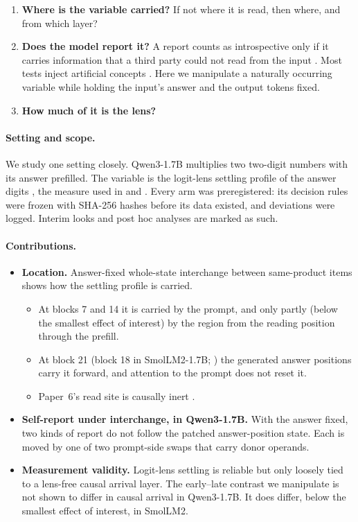\documentclass[11pt]{article}
\begin{document}
\begin{enumerate}
\item \textbf{Where is the variable carried?} If not where it is read, then where, and from which layer?
\item \textbf{Does the model report it?} A report counts as introspective only if it carries information that a third party could not read from the input \citep{song2025privileged,singh2026reality}. Most tests inject artificial concepts \citep{lindsey2025emergent,ferrara2026owmi,lederman2026contentagnostic}. Here we manipulate a naturally occurring variable while holding the input's answer and the output tokens fixed.
\item \textbf{How much of it is the lens?}
\end{enumerate}

\paragraph{Setting and scope.} We study one setting closely. Qwen3-1.7B \citep{yang2025qwen3} multiplies two two-digit numbers with its answer prefilled. The variable is the logit-lens settling profile of the answer digits \citep{nostalgebraist2020logitlens}, the measure used in \citet{ramdan2026crv2} and \citet{ramdan2026battery}. Every arm was preregistered: its decision rules were frozen with SHA-256 hashes before its data existed, and deviations were logged. Interim looks and post hoc analyses are marked as such.

\paragraph{Contributions.}
\begin{itemize}
\item \textbf{Location.} Answer-fixed whole-state interchange between same-product items shows how the settling profile is carried.
  \begin{itemize}
  \item At blocks 7 and 14 it is carried by the prompt, and only partly (below the smallest effect of interest) by the region from the reading position through the prefill.
  \item At block 21 (block 18 in SmolLM2-1.7B; \citealp{allal2025smollm2}) the generated answer positions carry it forward, and attention to the prompt does not reset it.
  \item Paper~6's read site is causally inert \citep{ramdan2026battery}.
  \end{itemize}
\item \textbf{Self-report under interchange, in Qwen3-1.7B.} With the answer fixed, two kinds of report do not follow the patched answer-position state. Each is moved by one of two prompt-side swaps that carry donor operands.
\item \textbf{Measurement validity.} Logit-lens settling is reliable but only loosely tied to a lens-free causal arrival layer. The early--late contrast we manipulate is not shown to differ in causal arrival in Qwen3-1.7B. It does differ, below the smallest effect of interest, in SmolLM2.
\end{itemize}
\end{document}
